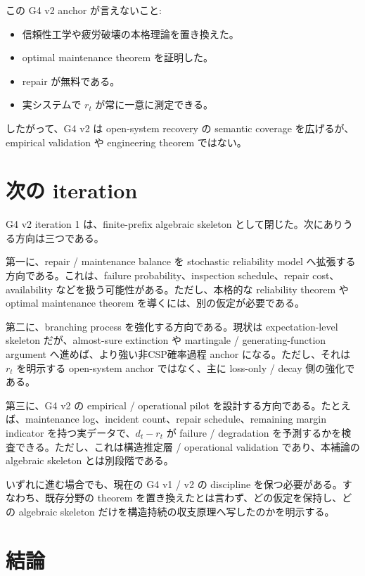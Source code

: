 \documentclass[12pt,a4paper]{article}
\begin{document}
この G4 v2 anchor が言えないこと:

\begin{itemize}
\tightlist
\item
  信頼性工学や疲労破壊の本格理論を置き換えた。
\item
  optimal maintenance theorem を証明した。
\item
  repair が無料である。
\item
  実システムで \(r_{t}\) が常に一意に測定できる。
\end{itemize}

したがって、G4 v2 は open-system recovery の semantic coverage を広げるが、empirical validation や engineering theorem ではない。

\section{次の iteration}\label{ux6b21ux306e-iteration}

G4 v2 iteration 1 は、finite-prefix algebraic skeleton として閉じた。次にありうる方向は三つである。

第一に、repair / maintenance balance を stochastic reliability model へ拡張する方向である。これは、failure probability、inspection schedule、repair cost、availability などを扱う可能性がある。ただし、本格的な reliability theorem や optimal maintenance theorem を導くには、別の仮定が必要である。

第二に、branching process を強化する方向である。現状は expectation-level skeleton だが、almost-sure extinction や martingale / generating-function argument へ進めば、より強い非CSP確率過程 anchor になる。ただし、それは \(r_{t}\) を明示する open-system anchor ではなく、主に loss-only / decay 側の強化である。

第三に、G4 v2 の empirical / operational pilot を設計する方向である。たとえば、maintenance log、incident count、repair schedule、remaining margin indicator を持つ実データで、\(d_{t}-r_{t}\) が failure / degradation を予測するかを検査できる。ただし、これは構造推定層 / operational validation であり、本補論の algebraic skeleton とは別段階である。

いずれに進む場合でも、現在の G4 v1 / v2 の discipline を保つ必要がある。すなわち、既存分野の theorem を置き換えたとは言わず、どの仮定を保持し、どの algebraic skeleton だけを構造持続の収支原理へ写したのかを明示する。

\section{結論}\label{ux7d50ux8ad6}
\end{document}
